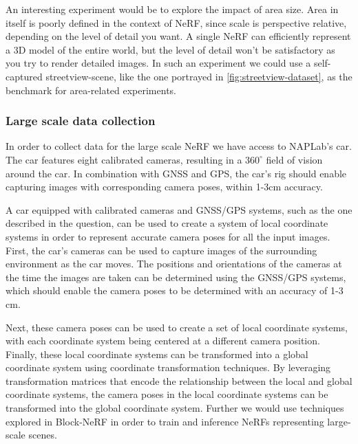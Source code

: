 An interesting experiment would be to explore the impact of area size. Area in itself is poorly defined in the context of NeRF, since scale is perspective relative, depending on the level of detail you want. A single NeRF can efficiently represent a 3D model of the entire world, but the level of detail won't be satisfactory as you try to render detailed images. In such an experiment we could use a self-captured streetview-scene, like the one portrayed in \autoref{fig:streetview-dataset}, as the benchmark for area-related experiments.

\subsubsection{Large scale data collection}
In order to collect data for the large scale NeRF we have access to NAPLab's car. The car features eight calibrated cameras, resulting in a $360^{\circ}$ field of vision around the car. In combination with GNSS and GPS, the car's rig should enable capturing images with corresponding camera poses, within 1-3cm accuracy.

A car equipped with calibrated cameras and GNSS/GPS systems, such as the one described in the question, can be used to create a system of local coordinate systems in order to represent accurate camera poses for all the input images. First, the car's cameras can be used to capture images of the surrounding environment as the car moves. The positions and orientations of the cameras at the time the images are taken can be determined using the GNSS/GPS systems, which should enable the camera poses to be determined with an accuracy of 1-3 cm.

Next, these camera poses can be used to create a set of local coordinate systems, with each coordinate system being centered at a different camera position. Finally, these local coordinate systems can be transformed into a global coordinate system using coordinate transformation techniques. By leveraging transformation matrices that encode the relationship between the local and global coordinate systems, the camera poses in the local coordinate systems can be transformed into the global coordinate system. Further we would use techniques explored in Block-NeRF \cite{tancik_block-nerf_2022} in order to train and inference NeRFs representing large-scale scenes.

